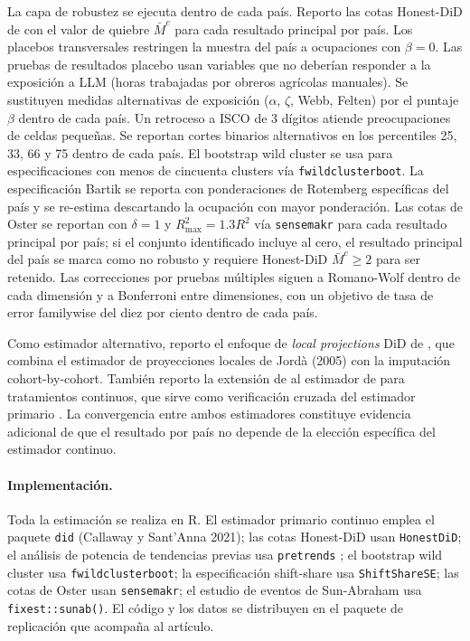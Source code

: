 La capa de robustez se ejecuta dentro de cada país. Reporto las cotas Honest-DiD de \citet{RambachanRoth2023_honest} con el valor de quiebre $\bar M^c$ para cada resultado principal por país. Los placebos transversales restringen la muestra del país a ocupaciones con $\beta = 0$. Las pruebas de resultados placebo usan variables que no deberían responder a la exposición a LLM (horas trabajadas por obreros agrícolas manuales). Se sustituyen medidas alternativas de exposición ($\alpha$, $\zeta$, Webb, Felten) por el puntaje $\beta$ dentro de cada país. Un retroceso a ISCO de 3 dígitos atiende preocupaciones de celdas pequeñas. Se reportan cortes binarios alternativos en los percentiles 25, 33, 66 y 75 dentro de cada país. El bootstrap wild cluster \citep{AbadieAIW2023_cluster} se usa para especificaciones con menos de cincuenta clusters vía \texttt{fwildclusterboot}. La especificación Bartik se reporta con ponderaciones de Rotemberg específicas del país y se re-estima descartando la ocupación con mayor ponderación. Las cotas de Oster \citep{Oster2019_unobservables} se reportan con $\delta = 1$ y $R^2_{\max} = 1.3 R^2$ vía \texttt{sensemakr} para cada resultado principal por país; si el conjunto identificado incluye al cero, el resultado principal del país se marca como no robusto y requiere Honest-DiD $\bar M^c \geq 2$ para ser retenido. Las correcciones por pruebas múltiples siguen a Romano-Wolf dentro de cada dimensión y a Bonferroni entre dimensiones, con un objetivo de tasa de error familywise del diez por ciento dentro de cada país.

Como estimador alternativo, reporto el enfoque de \emph{local projections} DiD de \citet{DubeGJT2023_lpdiff}, que combina el estimador de proyecciones locales de Jord\`a (2005) con la imputaci\'on cohort-by-cohort. Tambi\'en reporto la extensi\'on de \citet{DeChaisemartinHPVB2022_continuous} al estimador de \citet{DeChaisemartinH2020_twfe} para tratamientos continuos, que sirve como verificaci\'on cruzada del estimador primario \citep{CallawayCGBS2024_continuous}. La convergencia entre ambos estimadores constituye evidencia adicional de que el resultado por país no depende de la elecci\'on espec\'ifica del estimador continuo.

\paragraph{Implementaci\'on.} Toda la estimaci\'on se realiza en R. El estimador primario continuo emplea el paquete \texttt{did} (Callaway y Sant'Anna 2021); las cotas Honest-DiD usan \texttt{HonestDiD}; el an\'alisis de potencia de tendencias previas usa \texttt{pretrends} \citep{Roth2022_pretest_caution}; el bootstrap wild cluster usa \texttt{fwildclusterboot}; la especificaci\'on shift-share usa \texttt{ShiftShareSE}; las cotas de Oster usan \texttt{sensemakr}; el estudio de eventos de Sun-Abraham usa \texttt{fixest::sunab()}. El c\'odigo y los datos se distribuyen en el paquete de replicaci\'on que acompa\~na al art\'iculo.


